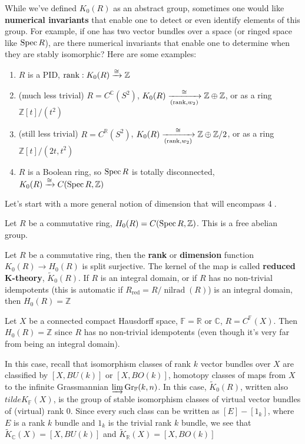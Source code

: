 \documentclass[main]{subfiles}
\begin{document}
While we've defined $K_0(R)$ as an abstract group, sometimes one would like \textbf{numerical invariants} that enable one to detect or even identify elements of this group. For example, if one has two vector bundles over a space (or ringed space like $\operatorname{Spec} R$), are there numerical invariants that enable one to determine when they are stably isomorphic? Here are some examples:
\begin{enumerate}[label=\textcircled{\arabic*}]
\item $R$ is a PID, $\operatorname{rank}:K_0(R)\xrightarrow{\cong}\mathbb Z$
\item (much less trivial) $R=C^{\mathbb C}(S^2)$, $K_0(R)\xrightarrow[(\operatorname{rank},w_2)]{\cong}\mathbb Z\oplus\mathbb Z$, or as a ring $\mathbb Z[t]/(t^2)$
\item (still less trivial) $R=C^{\mathbb R}(S^2)$, $K_0(R)\xrightarrow[(\operatorname{rank},w_2)]{\cong}\mathbb Z\oplus\mathbb Z/2$, or as a ring $\mathbb Z[t]/(2t, t^2)$
\item $R$ is a Boolean ring, so $\operatorname{Spec} R$ is totally disconnected, $K_0(R)\xrightarrow{\cong} C(\operatorname{Spec} R,\mathbb Z)$
\end{enumerate}

Let's start with a more general notion of dimension that will encompass \textcircled{4}.

\begin{definition}
Let $R$ be a commutative ring, $H_0(R)=C(\operatorname{Spec} R,\mathbb Z)$. This is a free abelian group.
\end{definition}

\begin{proposition}
Let $R$ be a commutative ring, then the \textbf{rank} or \textbf{dimension} function $K_0(R)\to H_0(R)$ is split surjective. The kernel of the map is called \textbf{reduced K-theory}, $\tilde K_0(R)$. If $R$ is an integral domain, or if $R$ has no non-trivial idempotents (this is automatic if $R_{\text{red}}=R/\operatorname{nilrad}(R)$) is an integral domain, then $H_0(R)=\mathbb Z$
\end{proposition}

\begin{example}
Let $X$ be a connected compact Hausdorff space, $\mathbb F=\mathbb R$ or $\mathbb C$, $R=C^{\mathbb F}(X)$. Then $H_0(R)=\mathbb Z$ since $R$ has no non-trivial idempotents (even though it's very far from being an integral domain).
\end{example}

In this case, recall that isomorphism classes of rank $k$ vector bundles over $X$ are classified by $[X,BU(k)]$ or $[X,BO(k)]$, homotopy classes of maps from $X$ to the infinite Grassmannian $\varinjlim\operatorname{Gr}_{\mathbb F}(k,n)$. In this case, $\tilde K_0(R)$, written also $tilde K_{\mathbb F}(X)$, is the group of stable isomorphism classes of virtual vector bundles of (virtual) rank 0. Since every such class can be written as $[E]-[1_k]$, where $E$ is a rank $k$ bundle and $1_k$ is the trivial rank $k$ bundle, we see that $\tilde K_{\mathbb C}(X)=[X,BU(k)]$ and $\tilde K_{\mathbb R}(X)=[X,BO(k)]$
\end{document}
